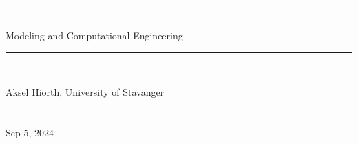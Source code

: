 \documentclass[graybox,sectrefs,envcountresetchap,open=right,final]{svmonodo}
\begin{document}

\newcommand{\exercisesection}[1]{\subsection*{#1}}






\frontmatter
\setcounter{page}{3}
\pagestyle{headings}



\thispagestyle{empty}
\hbox{\ \ }
\vfill
\begin{center}
{\huge{\bfseries{
\begin{spacing}{1.25}
{\rule{\linewidth}{0.5mm}} \\[0.4cm]
{Modeling and Computational Engineering }
\\[0.4cm] {\rule{\linewidth}{0.5mm}} \\[1.5cm]
\end{spacing}
}}}


\vspace{0.5cm}

{\Large\textsf{Aksel Hiorth, University of Stavanger${}^{}$}}\\ [3mm]

\ \\ [2mm]


\ \\ [10mm]
{\large\textsf{Sep 5, 2024}}
\end{center}
\vfill
\clearpage

\setpagesize
\end{document}
